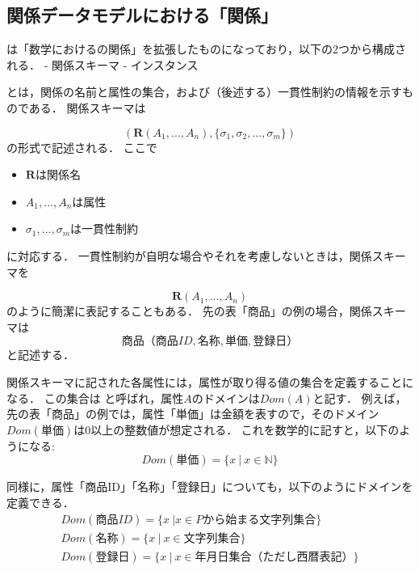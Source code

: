 \subsection{関係データモデルにおける「関係」}
は「数学におけるの関係」を拡張したものになっており，以下の2つから構成される．
- 関係スキーマ
- インスタンス

 とは，関係の名前と属性の集合，および（後述する）一貫性制約の情報を示すものである．
関係スキーマは

\begin{equation}
(\boldsymbol{R}(A_1, ..., A_n), \{\sigma_1, \sigma_2, ..., \sigma_m\})
\end{equation}
の形式で記述される．
ここで
\begin{itemize}
\item $\boldsymbol{R}$は関係名
\item $A_1, ..., A_n$は属性
\item $\sigma_1, ..., \sigma_m$は一貫性制約
\end{itemize}
に対応する．
一貫性制約が自明な場合やそれを考慮しないときは，関係スキーマを

\begin{equation}
\boldsymbol{R}(A_1, ..., A_n)
\end{equation}
のように簡潔に表記することもある．
先の表「商品」の例の場合，関係スキーマは
\begin{equation}
商品（商品ID, 名称, 単価, 登録日）
\end{equation}
と記述する．

関係スキーマに記された各属性には，属性が取り得る値の集合を定義することになる．
この集合は と呼ばれ，属性$A$のドメインは$Dom(A)$と記す．
例えば，先の表「商品」の例では，属性「単価」は金額を表すので，そのドメイン$Dom(単価)$は0以上の整数値が想定される．
これを数学的に記すと，以下のようになる:
\begin{equation}
Dom(単価) = \{ x \ | \ x \in \mathbb{N} \}
\end{equation}

同様に，属性「商品ID」「名称」「登録日」についても，以下のようにドメインを定義できる．
\begin{eqnarray}
Dom(商品ID) = \{ x \ | x \in Pから始まる文字列集合 \} \\
Dom(名称) = \{ x \ | \ x \in 文字列集合 \} \\
Dom(登録日) = \{ x \ | \ x \in 年月日集合（ただし西暦表記） \}
\end{eqnarray}

